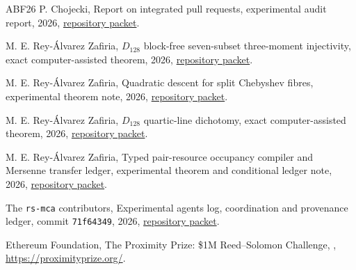 \documentclass[11pt,a4paper]{amsart}
\numberwithin{equation}{section}
\theoremstyle{remark}
\begin{document}
\begin{thebibliography}{ABF26}
P. Chojecki,
\newblock Report on integrated pull requests,
\newblock experimental audit report, 2026,
\newblock \href{https://github.com/przchojecki/rs-mca/blob/71f64349a8fa8cbf05678a6e9d4e00e8e06d7de5/experimental/PR-report-1.tex}{repository packet}.

M. E. Rey-\'Alvarez Zafiria,
\newblock $D_{128}$ block-free seven-subset three-moment injectivity,
\newblock exact computer-assisted theorem, 2026,
\newblock \href{https://github.com/przchojecki/rs-mca/pull/1015}{repository packet}.

M. E. Rey-\'Alvarez Zafiria,
\newblock Quadratic descent for split Chebyshev fibres,
\newblock experimental theorem note, 2026,
\newblock \href{https://github.com/przchojecki/rs-mca/pull/1016}{repository packet}.

M. E. Rey-\'Alvarez Zafiria,
\newblock $D_{128}$ quartic-line dichotomy,
\newblock exact computer-assisted theorem, 2026,
\newblock \href{https://github.com/przchojecki/rs-mca/pull/1017}{repository packet}.

M. E. Rey-\'Alvarez Zafiria,
\newblock Typed pair-resource occupancy compiler and Mersenne transfer ledger,
\newblock experimental theorem and conditional ledger note, 2026,
\newblock \href{https://github.com/przchojecki/rs-mca/pull/1018}{repository packet}.

The \texttt{rs-mca} contributors,
\newblock Experimental agents log,
\newblock coordination and provenance ledger, commit \texttt{71f64349}, 2026,
\newblock \href{https://github.com/przchojecki/rs-mca/blob/71f64349a8fa8cbf05678a6e9d4e00e8e06d7de5/experimental/agents-log.md}{repository packet}.

Ethereum Foundation,
\newblock The Proximity Prize: \$1M Reed--Solomon Challenge,
, \url{https://proximityprize.org/}.

\end{thebibliography}
\end{document}
